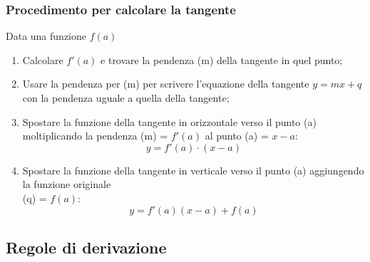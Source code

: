 \documentclass{article}
\begin{document}
\subsubsection{Procedimento per calcolare la tangente}
Data una funzione \(f(a)\)
\begin{enumerate}
    \item Calcolare \(f'(a)\) e trovare la pendenza (m) della tangente in quel punto;
    \item Usare la pendenza per (m) per scrivere l'equazione della tangente
        \(y=mx+q\) con la pendenza uguale a quella della tangente;
    \item Spostare la funzione della tangente in orizzontale verso il punto (a)
        moltiplicando la pendenza (m) = \(f'(a)\) al punto (a) = \(x-a\): 
        \begin{equation*}
            y=f'(a)\cdot (x-a)
        \end{equation*}
    \item Spostare la funzione della tangente in verticale verso il punto (a)
        aggiungendo la funzione originale\\ (q) = \(f(a)\): 
        \begin{equation*}
            y=f'(a)(x-a)+f(a)
        \end{equation*}
\end{enumerate}

\newpage
\subsection{Regole di derivazione}
\end{document}
